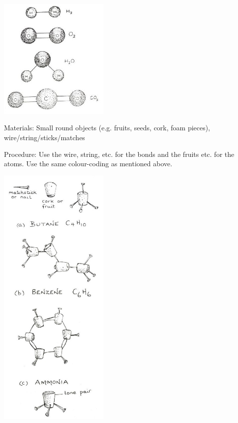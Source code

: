 \begin{multicols}{2}
\begin{center}
\includegraphics[width=0.4\textwidth]{./img/source/3d-models.jpg}
\end{center}

\begin{description*}
\item[Materials:]{Small round objects (e.g. fruits, seeds, cork, foam pieces), wire/string/sticks/matches}
\item[Procedure:]{Use the wire, string, etc. for the bonds and the fruits etc. for the atoms. Use the same colour-coding as mentioned above.}
\end{description*}

\begin{center} %
\includegraphics[width=0.4\textwidth]{./img/source/3d-models-2.jpg}
\end{center}


\end{multicols}
